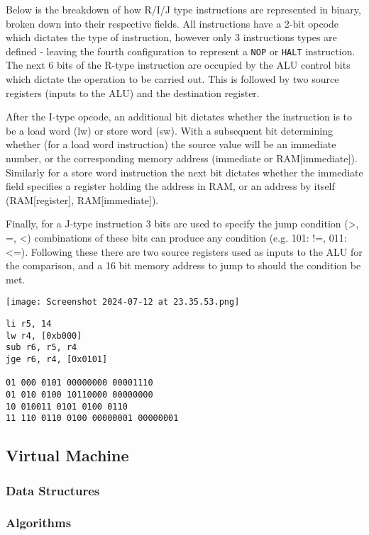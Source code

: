 Below is the breakdown of how R/I/J type instructions are represented in binary, broken down into their respective fields. All instructions have a 2-bit opcode which dictates the type of instruction, however only 3 instructions types are defined - leaving the fourth configuration to represent a \texttt{NOP} or \texttt{HALT} instruction. The next 6 bits of the R-type instruction are occupied by the ALU control bits which dictate the operation to be carried out. This is followed by two source registers (inputs to the ALU) and the destination register.

After the I-type opcode, an additional bit dictates whether the instruction is to be a load word (lw) or store word (sw). With a subsequent bit determining whether (for a load word instruction) the source value will be an immediate number, or the corresponding memory address (immediate or RAM[immediate]). Similarly for a store word instruction the next bit dictates whether the immediate field specifies a register holding the address in RAM, or an address by itself (RAM[register], RAM[immediate]).  

Finally, for a J-type instruction 3 bits are used to specify the jump condition (>, =, <) combinations of these bits can produce any condition (e.g. 101: !=, 011: <=). Following these there are two source registers used as inputs to the ALU for the comparison, and a 16 bit memory address to jump to should the condition be met. 

\bigskip

\texttt{[image: Screenshot 2024-07-12 at 23.35.53.png]}

\begin{lstlisting}
li r5, 14
lw r4, [0xb000]
sub r6, r5, r4
jge r6, r4, [0x0101]

01 000 0101 00000000 00001110
01 010 0100 10110000 00000000
10 010011 0101 0100 0110
11 110 0110 0100 00000001 00000001
\end{lstlisting}

\subsection{Virtual Machine}
\subsubsection{Data Structures}
\subsubsection{Algorithms}